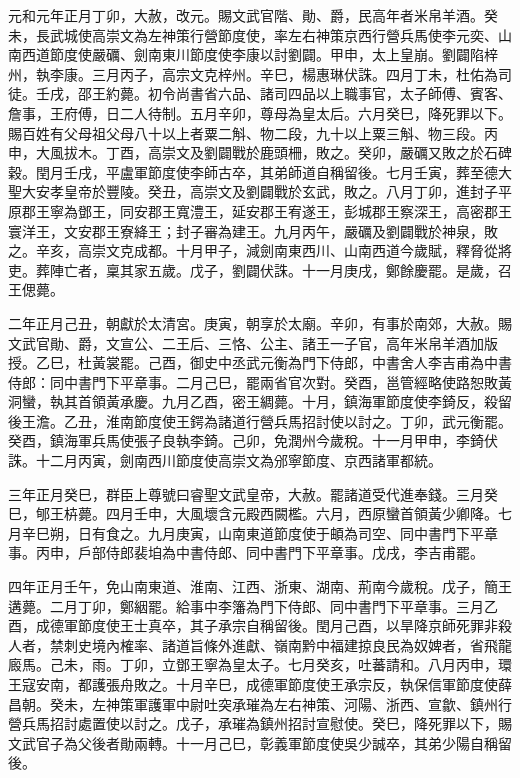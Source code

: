 \begin{pinyinscope}
 元和元年正月丁卯，大赦，改元。賜文武官階、勛、爵，民高年者米帛羊酒。癸未，長武城使高崇文為左神策行營節度使，率左右神策京西行營兵馬使李元奕、山南西道節度使嚴礪、劍南東川節度使李康以討劉闢。甲申，太上皇崩。劉闢陷梓州，執李康。三月丙子，高宗文克梓州。辛巳，楊惠琳伏誅。四月丁未，杜佑為司徒。壬戌，邵王約薨。初令尚書省六品、諸司四品以上職事官，太子師傅、賓客、詹事，王府傅，日二人待制。五月辛卯，尊母為皇太后。六月癸巳，降死罪以下。賜百姓有父母祖父母八十以上者粟二斛、物二段，九十以上粟三斛、物三段。丙申，大風拔木。丁酉，高崇文及劉闢戰於鹿頭柵，敗之。癸卯，嚴礪又敗之於石碑穀。閏月壬戌，平盧軍節度使李師古卒，其弟師道自稱留後。七月壬寅，葬至德大聖大安孝皇帝於豐陵。癸丑，高崇文及劉闢戰於玄武，敗之。八月丁卯，進封子平原郡王寧為鄧王，同安郡王寬澧王，延安郡王宥遂王，彭城郡王察深王，高密郡王寰洋王，文安郡王寮絳王；封子審為建王。九月丙午，嚴礪及劉闢戰於神泉，敗之。辛亥，高崇文克成都。十月甲子，減劍南東西川、山南西道今歲賦，釋脅從將吏。葬陣亡者，稟其家五歲。戊子，劉闢伏誅。十一月庚戌，鄭餘慶罷。是歲，召王偲薨。



 二年正月己丑，朝獻於太清宮。庚寅，朝享於太廟。辛卯，有事於南郊，大赦。賜文武官勛、爵，文宣公、二王后、三恪、公主、諸王一子官，高年米帛羊酒加版授。乙巳，杜黃裳罷。己酉，御史中丞武元衡為門下侍郎，中書舍人李吉甫為中書侍郎：同中書門下平章事。二月己巳，罷兩省官次對。癸酉，邕管經略使路恕敗黃洞蠻，執其首領黃承慶。九月乙酉，密王綢薨。十月，鎮海軍節度使李錡反，殺留後王澹。乙丑，淮南節度使王鍔為諸道行營兵馬招討使以討之。丁卯，武元衡罷。癸酉，鎮海軍兵馬使張子良執李錡。己卯，免潤州今歲稅。十一月甲申，李錡伏誅。十二月丙寅，劍南西川節度使高崇文為邠寧節度、京西諸軍都統。



 三年正月癸巳，群臣上尊號曰睿聖文武皇帝，大赦。罷諸道受代進奉錢。三月癸巳，郇王枿薨。四月壬申，大風壞含元殿西闕檻。六月，西原蠻首領黃少卿降。七月辛巳朔，日有食之。九月庚寅，山南東道節度使于頔為司空、同中書門下平章事。丙申，戶部侍郎裴垍為中書侍郎、同中書門下平章事。戊戌，李吉甫罷。



 四年正月壬午，免山南東道、淮南、江西、浙東、湖南、荊南今歲稅。戊子，簡王遘薨。二月丁卯，鄭絪罷。給事中李籓為門下侍郎、同中書門下平章事。三月乙酉，成德軍節度使王士真卒，其子承宗自稱留後。閏月己酉，以旱降京師死罪非殺人者，禁刺史境內榷率、諸道旨條外進獻、嶺南黔中福建掠良民為奴婢者，省飛龍廄馬。己未，雨。丁卯，立鄧王寧為皇太子。七月癸亥，吐蕃請和。八月丙申，環王寇安南，都護張舟敗之。十月辛巳，成德軍節度使王承宗反，執保信軍節度使薛昌朝。癸未，左神策軍護軍中尉吐突承璀為左右神策、河陽、浙西、宣歙、鎮州行營兵馬招討處置使以討之。戊子，承璀為鎮州招討宣慰使。癸巳，降死罪以下，賜文武官子為父後者勛兩轉。十一月己巳，彰義軍節度使吳少誠卒，其弟少陽自稱留後。




\end{pinyinscope}
